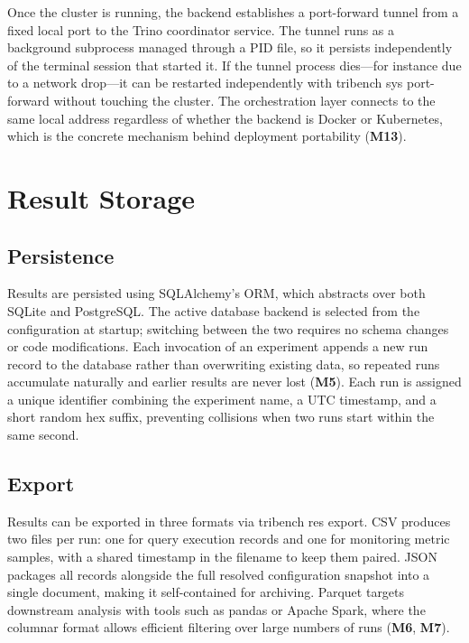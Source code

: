 \documentclass{l4proj}
\begin{document}
Once the cluster is running, the backend establishes a port-forward tunnel from a fixed local port to the Trino coordinator service. The tunnel runs as a background subprocess managed through a PID file, so it persists independently of the terminal session that started it. If the tunnel process dies---for instance due to a network drop---it can be restarted independently with tribench sys port-forward without touching the cluster. The orchestration layer connects to the same local address regardless of whether the backend is Docker or Kubernetes, which is the concrete mechanism behind deployment portability (\textbf{M13}).

\section{Result Storage}
\label{sec:impl_storage}

\subsection{Persistence}
\label{sec:impl_persistence}

Results are persisted using SQLAlchemy's ORM, which abstracts over both SQLite and PostgreSQL. The active database backend is selected from the configuration at startup; switching between the two requires no schema changes or code modifications. Each invocation of an experiment appends a new run record to the database rather than overwriting existing data, so repeated runs accumulate naturally and earlier results are never lost (\textbf{M5}). Each run is assigned a unique identifier combining the experiment name, a UTC timestamp, and a short random hex suffix, preventing collisions when two runs start within the same second.

\subsection{Export}
\label{sec:impl_export}

Results can be exported in three formats via tribench res export. CSV produces two files per run: one for query execution records and one for monitoring metric samples, with a shared timestamp in the filename to keep them paired. JSON packages all records alongside the full resolved configuration snapshot into a single document, making it self-contained for archiving. Parquet targets downstream analysis with tools such as pandas or Apache Spark, where the columnar format allows efficient filtering over large numbers of runs (\textbf{M6}, \textbf{M7}).
\end{document}
